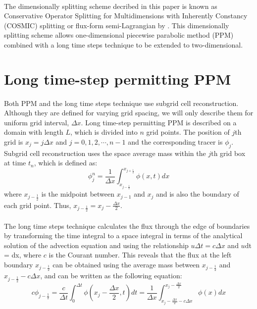 \paragraph{}
The dimensionally splitting scheme decribed in this paper is known as Conservative Operator Splitting for Multidimensions with Inherently Constancy (COSMIC) splitting \citep{Leonard1996} or flux-form semi-Lagrangian by \citep{Lin1996}. This dimensionally splitting scheme allows one-dimensional piecewise parabolic method (PPM) \citep{Colella1984} combined with a long time steps technique \citep{Leonard1995} to be extended to two-dimensional.
\section{Long time-step permitting PPM} 
\label{sec:PPM} 
\paragraph{} 
Both PPM and the long time steps technique use subgrid cell reconstruction. Although they are defined for varying grid spacing, we will only describe them for uniform grid interval, $\Delta x$. Long time-step permitting PPM is described on a domain with length $L$, which is divided into $n$ grid points. The position of $j$th grid is $x_j = j\Delta x$ and $j = 0, 1, 2, \cdots, n-1$ and the corresponding tracer is $\phi_j$. Subgrid cell reconstruction uses the space average mass within the $j$th grid box at time $t_n$, which is defined as: 
\begin{equation} \label{eq:2.1} 
\phi^n_j = \frac{1}{\Delta x} \int^{x_{j+\frac{1}{2}}}_{x_{j-\frac{1}{2}}} \phi (x,t)dx
\end{equation}
where $x_{j-\frac{1}{2}}$ is the midpoint between $x_{j-1}$ and $x_{j}$ and is also the boundary of each grid point. Thus, $x_{j-\frac{1}{2}} = x_j - \frac{\Delta x}{2}$.
\paragraph{} 
The long time steps technique \citep{Leonard1995} calculates the flux through the edge of boundaries by transforming the time integral to a space integral in terms of the analytical solution of the advection equation and using the relationship $u\Delta t = c\Delta x$ and $u$dt = dx, where $c$ is the Courant number. This reveals that the flux at the left boundary $x_{j-\frac{1}{2}}$ can be obtained using the average mass between $x_{j-\frac{1}{2}}$ and $x_{j-\frac{1}{2}}-c\Delta x$, and can be written as the following equation:
\begin{equation} \label{eq:2.2} 
c\phi_{j-\frac{1}{2}} = \frac{c}{\Delta t} \int^{\Delta t}_{0} \phi (x_j - \frac{\Delta x}{2}, t)dt = \frac{1}{\Delta x} \int^{x_j-\frac {\Delta x}{2}}_{x_j-\frac {\Delta x}{2}-c\Delta x} \phi (x)dx 
\end{equation} 
